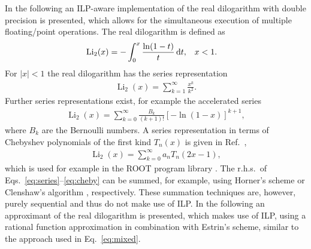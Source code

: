 \documentclass[10pt,DIV=16,twocolumn,numbers=noenddot]{scrartcl}
\newcommand{\Li}{\operatorname{Li}_2}
\begin{document}
In the following an ILP-aware implementation of the real dilogarithm
with double precision is presented, which allows for the simultaneous
execution of multiple floating\-/point operations.  The real
dilogarithm is defined as
%
\begin{align}
  \Li(x) &= -\int_0^x \frac{\ln(1-t)}{t} \, \textnormal{d}t, &
  &x<1.
\end{align}
%
For $|x|<1$ the real dilogarithm has the series representation
%
\begin{align}
  \Li(x) = \sum_{k=1}^\infty \frac{x^k}{k^2}.
  \label{eq:series}
\end{align}
%
Further series representations exist, for example the accelerated
series
%
\begin{align}
  \Li(x) = \sum_{k=0}^\infty \frac{B_k}{(k+1)!} [-\ln(1-x)]^{k+1},
\end{align}
%
where $B_k$ are the Bernoulli numbers.  A series representation in
terms of Chebyshev polynomials of the first kind $T_n(x)$ is given in
Ref.~\cite{luke},
%
\begin{align}
  \Li(x) = \sum_{k=0}^\infty a_n T_n(2x-1),
  \label{eq:cheby}
\end{align}
%
which is used for example in the ROOT program library \cite{root}.
The r.h.s.\ of Eqs.~\eqref{eq:series}--\eqref{eq:cheby} can be summed,
for example, using Horner's scheme or Clenshaw's algorithm
\cite{clenshaw}, respectively.  These summation techniques are,
however, purely sequential and thus do not make use of ILP.  In the
following an approximant of the real dilogarithm is presented, which
makes use of ILP, using a rational function approximation in
combination with Estrin's scheme, similar to the approach used in
Eq.~\eqref{eq:mixed}.
\end{document}
